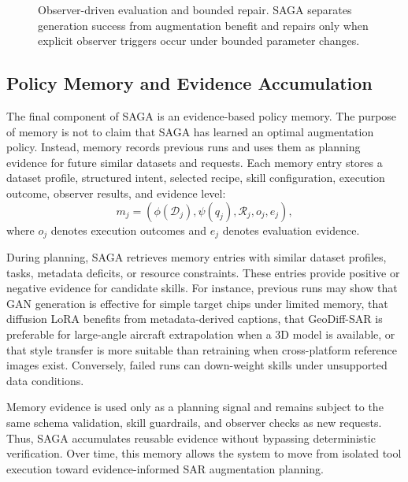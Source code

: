 \begin{figure}[t]
    \centering
    \caption{Observer-driven evaluation and bounded repair. SAGA separates generation success from augmentation benefit and repairs only when explicit observer triggers occur under bounded parameter changes.}
    \label{fig:observer_repair}
\end{figure}

\subsection{Policy Memory and Evidence Accumulation}
\label{subsec:policy_memory}

The final component of SAGA is an evidence-based policy memory.
The purpose of memory is not to claim that SAGA has learned an optimal augmentation policy.
Instead, memory records previous runs and uses them as planning evidence for future similar datasets and requests.
Each memory entry stores a dataset profile, structured intent, selected recipe, skill configuration, execution outcome, observer results, and evidence level:
\begin{equation}
m_j =
(\phi(\mathcal{D}_j), \psi(q_j), \mathcal{R}_j, o_j, e_j),
\end{equation}
where $o_j$ denotes execution outcomes and $e_j$ denotes evaluation evidence.

During planning, SAGA retrieves memory entries with similar dataset profiles, tasks, metadata deficits, or resource constraints.
These entries provide positive or negative evidence for candidate skills.
For instance, previous runs may show that GAN generation is effective for simple target chips under limited memory, that diffusion LoRA benefits from metadata-derived captions, that GeoDiff-SAR is preferable for large-angle aircraft extrapolation when a 3D model is available, or that style transfer is more suitable than retraining when cross-platform reference images exist.
Conversely, failed runs can down-weight skills under unsupported data conditions.

Memory evidence is used only as a planning signal and remains subject to the same schema validation, skill guardrails, and observer checks as new requests.
Thus, SAGA accumulates reusable evidence without bypassing deterministic verification.
Over time, this memory allows the system to move from isolated tool execution toward evidence-informed SAR augmentation planning.

